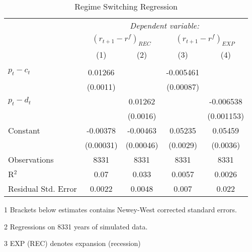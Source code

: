\begin{table}[H]
\centering   
  \caption{Regime Switching Regression}           
  \label{tab:RSregress}     
  \begin{threeparttable}
\begin{tabular}{@{\hspace{5pt}}l@{\hspace{5pt}}cccc} 
\toprule 
 & \multicolumn{4}{c}{\textit{Dependent variable:}} \\ 
 & \multicolumn{2}{c}{$\left(r_{t+1}-r^f\right)_{REC}$} & \multicolumn{2}{c}{$\left(r_{t+1}-r^f\right)_{EXP}$} \\ 
 \cmidrule(rr){2-5}
 & (1)   &   (2) & (3) & (4) \\ 
\midrule  
\\[-2.1ex] $ p_t - c_t $ & 0.01266&  &-0.005461   & \\ 
  & (0.0011) & &(0.00087) & \\ 
 \addlinespace 
 $p_t - d_t$ &  & 0.01262 & &-0.006538 \\
 & & (0.0016) & &(0.001153) \\
 \addlinespace 
 Constant &-0.00378 &-0.00463 &0.05235 &0.05459 \\ 
  &(0.00031) &(0.00046) &(0.0029) &(0.0036) \\ 
 \addlinespace 
\midrule  
Observations & 8331 & 8331 & 8331 &8331\\ 
R$^{2}$ &0.07 & 0.033 & 0.0057 &0.0026\\ 
Residual Std. Error &0.0022 & 0.0048 &0.007 & 0.022  \\ 
\bottomrule 
\end{tabular} 
\begin{tablenotes}
\footnotesize{
\item[1] Brackets below estimates contains Newey-West corrected standard errors. 
\item[2] Regressions on 8331 years of simulated data.
\item[3] EXP (REC) denotes expansion (recession)
}
\end{tablenotes}
\end{threeparttable}
\end{table} 
